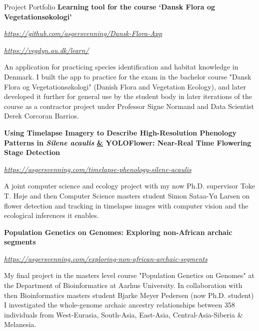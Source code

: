 
\begin{rubric}{Project Portfolio}
%
    \textbf{Learning tool for the course ‘Dansk Flora og Vegetationsøkologi’}\par
    \href{https://github.com/asgersvenning/Dansk-Flora-App}{\color{blue}\textit{https://github.com/asgersvenning/Dansk-Flora-App}}\par
    \href{https://vegdyn.au.dk/learn/}{\color{SwishLineColour}\textit{https://vegdyn.au.dk/learn/}}\par
    \pind An application for practicing species identification and habitat knowledge in Denmark. I built the app to practice for the exam in the bachelor course "Dansk Flora og Vegetationsøkologi" (Danish Flora and Vegetation Ecology), and later developed it further for general use by the student body in later iterations of the course as a contractor project under Professor Signe Normand and Data Scientist Derek Corcoran Barrios.

%
    \textbf{Using Timelapse Imagery to Describe High-Resolution Phenology Patterns in \textit{Silene acaulis} \underline{\&} YOLOFlower: Near-Real Time Flowering Stage Detection}\par
    \href{https://asgersvenning.com/timelapse-phenology-silene-acaulis}{\color{blue}\textit{https://asgersvenning.com/timelapse-phenology-silene-acaulis}}\par
    \pind A joint computer science and ecology project with my now Ph.D. supervisor Toke T. Høje and then Computer Science masters student Simon Sataa-Yu Larsen on flower detection and tracking in timelapse images with computer vision and the ecological inferences it enables.

%
    \textbf{Population Genetics on Genomes: Exploring non-African archaic segments}\par
    \href{https://asgersvenning.com/exploring-non-african-archaic-segments}{\color{blue}\textit{https://asgersvenning.com/exploring-non-african-archaic-segments}}\par
    \pind My final project in the masters level course "Population Genetics on Genomes" at the Department of Bioinformatics at Aarhus University. In collaboration with then Bioinformatics masters student Bjarke Meyer Pedersen (now Ph.D. student) I investigated the whole-genome archaic ancestry relationships between 358 individuals from West-Eurasia, South-Asia, East-Asia, Central-Asia-Siberia \& Melanesia.


\end{rubric}
